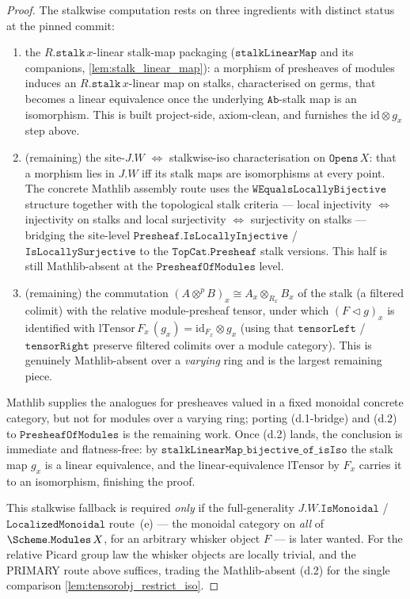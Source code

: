 \begin{proof}
  The stalkwise computation rests on three ingredients with distinct status at the
  pinned commit:
  \begin{enumerate}
    \item[(d.1-done)] the \(R.\mathtt{stalk}\,x\)-linear stalk-map packaging
      (\(\mathtt{stalkLinearMap}\) and its companions, \cref{lem:stalk_linear_map}):
      a morphism of presheaves of modules induces an \(R.\mathtt{stalk}\,x\)-linear
      map on stalks, characterised on germs, that becomes a linear equivalence once
      the underlying \(\mathtt{Ab}\)-stalk map is an isomorphism. This is built
      project-side, axiom-clean, and furnishes the \(\mathrm{id} \otimes g_x\) step
      above.
    \item[(d.1-bridge)] (remaining) the site-\(J.W\) \(\Longleftrightarrow\)
      stalkwise-iso characterisation on \(\mathtt{Opens}\,X\): that a morphism lies
      in \(J.W\) iff its stalk maps are isomorphisms at every point. The concrete
      Mathlib assembly route uses the \(\mathtt{WEqualsLocallyBijective}\) structure
      together with the topological stalk criteria --- local injectivity
      \(\Longleftrightarrow\) injectivity on stalks and local surjectivity
      \(\Longleftrightarrow\) surjectivity on stalks --- bridging the site-level
      \(\mathtt{Presheaf.IsLocallyInjective}\) / \(\mathtt{IsLocallySurjective}\)
      to the \(\mathtt{TopCat.Presheaf}\) stalk versions. This half is still
      Mathlib-absent at the \(\mathtt{PresheafOfModules}\) level.
    \item[(d.2)] (remaining) the commutation \((A \otimes^{p} B)_x \cong A_x
      \otimes_{R_x} B_x\) of the stalk (a filtered colimit) with the relative
      module-presheaf tensor, under which \((F \triangleleft g)_x\) is identified
      with \(\mathrm{lTensor}\,F_x\,(g_x) = \mathrm{id}_{F_x} \otimes g_x\) (using
      that \(\mathtt{tensorLeft}\) / \(\mathtt{tensorRight}\) preserve filtered
      colimits over a module category). This is genuinely Mathlib-absent over a
      \emph{varying} ring and is the largest remaining piece.
  \end{enumerate}
  Mathlib supplies the analogues for presheaves valued in a fixed monoidal concrete
  category, but not for modules over a varying ring; porting (d.1-bridge) and (d.2)
  to \(\mathtt{PresheafOfModules}\) is the remaining work. Once (d.2) lands, the
  conclusion is immediate and flatness-free: by
  \(\mathtt{stalkLinearMap\_bijective\_of\_isIso}\) the stalk map \(g_x\) is a
  linear equivalence, and the linear-equivalence \(\mathrm{lTensor}\) by \(F_x\)
  carries it to an isomorphism, finishing the proof.

  This stalkwise fallback is required \emph{only} if the full-generality
  \(J.W.\mathtt{IsMonoidal}\) / \(\mathtt{LocalizedMonoidal}\) route~(e) --- the
  monoidal category on \emph{all} of \(\Scheme.\mathtt{Modules}\,X\), for an
  arbitrary whisker object \(F\) --- is later wanted. For the relative Picard group
  law the whisker objects are locally trivial, and the PRIMARY route above suffices,
  trading the Mathlib-absent (d.2) for the single comparison
  \cref{lem:tensorobj_restrict_iso}.
\end{proof}

